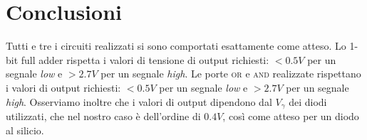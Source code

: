 \section{Conclusioni}\label{sec:conclusioni}
Tutti e tre i circuiti realizzati si sono comportati esattamente come atteso.
Lo 1-bit full adder rispetta i valori di tensione di output richiesti: $<0.5V$ per un
segnale \emph{low} e $>2.7V$ per un segnale \emph{high}.
Le porte \textsc{or} e \textsc{and} realizzate rispettano i valori di output richiesti: $<0.5V$ per un
segnale \emph{low} e $>2.7V$ per un segnale \emph{high}.
Osserviamo inoltre che i valori di output dipendono dal $V_\gamma$ dei diodi
utilizzati, che nel nostro caso è dell'ordine di $0.4V$, così come atteso per un diodo al silicio.
